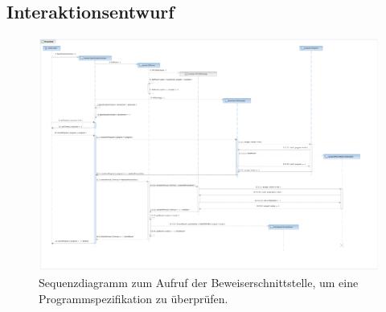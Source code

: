 \begin{description}%

\end{description}%

\subsection{Interaktionsentwurf}%

\begin{landscape}%
    \begin{figure}[p]%
        \vspace{-2cm}%
        \includegraphics[height=1.2\textheight]{diagrams/programchecking_sequence.pdf}%

        \caption{Sequenzdiagramm zum Aufruf der Beweiserschnittstelle,
        um eine Programmspezifikation zu überprüfen.}%

    \end{figure}%
\end{landscape}%
